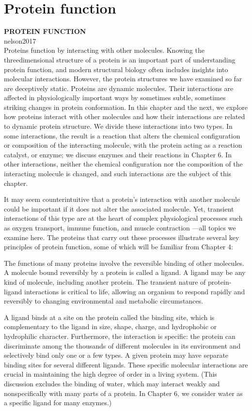 \section{Protein function}
\textbf{PROTEIN FUNCTION}\\
nelson2017\\
Proteins function by interacting with other molecules. Knowing the threedimensional structure of a protein is an important part of understanding protein function, and modern structural biology often includes insights into molecular interactions. However, the protein structures we have examined so far are deceptively static. Proteins are dynamic molecules. Their interactions are affected in physiologically important ways by sometimes subtle, sometimes striking changes in protein conformation. In this chapter and the next, we explore how proteins interact with other molecules and how their interactions are related to dynamic protein structure. We divide these interactions into two types. In some interactions, the result is a reaction that alters the chemical configuration or composition of the interacting molecule, with the protein acting as a reaction catalyst, or enzyme; we discuss enzymes and their reactions in Chapter 6. In other interactions, neither the chemical configuration nor the composition of the interacting molecule is changed, and such interactions are the subject of this chapter.

It may seem counterintuitive that a protein’s interaction with another molecule could be important if it does not alter the associated molecule. Yet, transient interactions of this type are at the heart of complex physiological processes such as oxygen transport, immune function, and muscle contraction —all topics we examine here. The proteins that carry out these processes illustrate several key principles of protein function, some of which will be familiar from Chapter 4: 

The functions of many proteins involve the reversible binding of other molecules. A molecule bound reversibly by a protein is called a ligand. A ligand may be any kind of molecule, including another protein. The transient nature of protein-ligand interactions is critical to life, allowing an organism to respond rapidly and reversibly to changing environmental and metabolic circumstances. 

A ligand binds at a site on the protein called the binding site, which is complementary to the ligand in size, shape, charge, and hydrophobic or hydrophilic character. Furthermore, the interaction is specific: the protein can discriminate among the thousands of different molecules in its environment and selectively bind only one or a few types. A given protein may have separate binding sites for several different ligands. These specific molecular interactions are crucial in maintaining the high degree of order in a living system. (This discussion excludes the binding of water, which may interact weakly and nonspecifically with many parts of a protein. In Chapter 6, we consider water as a specific ligand for many enzymes.) 

